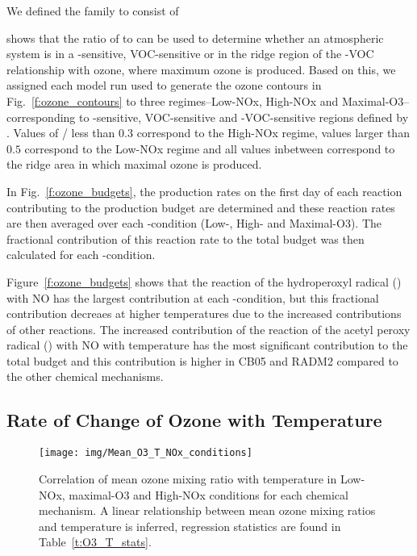 We defined the  family to consist of 

\citet{Sillman:1995} shows that the ratio of  to  can be used to determine whether an atmospheric system is in a -sensitive, VOC-sensitive or in the ridge region of the -VOC relationship with ozone, where maximum ozone is produced.
Based on this, we assigned each model run used to generate the ozone contours in Fig.~\ref{f:ozone_contours} to three  regimes--Low-NOx, High-NOx and Maximal-O3--corresponding to -sensitive, VOC-sensitive and -VOC-sensitive regions defined by \citet{Sillman:1995}.
Values of / less than $0.3$ correspond to the High-NOx regime, values larger than $0.5$ correspond to the Low-NOx regime and all values inbetween correspond to the ridge area in which maximal ozone is produced.

In Fig.~\ref{f:ozone_budgets}, the production rates on the first day of each reaction contributing to the  production budget are determined and these reaction rates are then averaged over each -condition (Low-, High- and Maximal-O3).
The fractional contribution of this reaction rate to the total  budget was then calculated for each -condition.

Figure~\ref{f:ozone_budgets} shows that the reaction of the hydroperoxyl radical () with NO has the largest contribution at each -condition, but this fractional contribution decreaes at higher temperatures due to the increased contributions of other reactions.
The increased contribution of the reaction of the acetyl peroxy radical () with NO with temperature has the most significant contribution to the total  budget and this contribution is higher in CB05 and RADM2 compared to the other chemical mechanisms.

\subsection{Rate of Change of Ozone with Temperature} \label{ss:r_mO3-T}

\begin{figure}%
    \centering%
    \caption{Correlation of mean ozone mixing ratio with temperature in Low-NOx, maximal-O3 and High-NOx conditions for each chemical mechanism. A linear relationship between mean ozone mixing ratios and temperature is inferred, regression statistics are found in Table~\ref{t:O3_T_stats}.}%
    \label{f:rate_O3_T}%
    \texttt{[image: img/Mean\_O3\_T\_NOx\_conditions]}
\end{figure}

